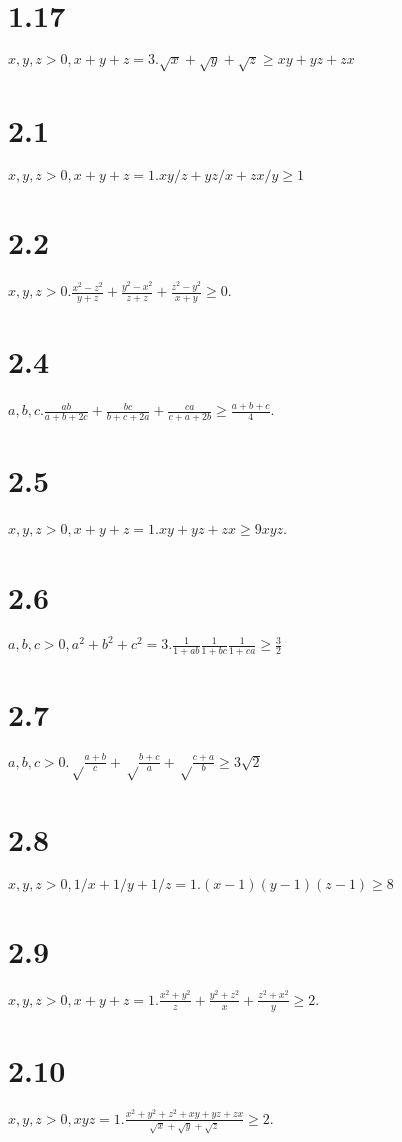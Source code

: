 \documentclass{article}
\begin{document}
\section*{1.17}

$x, y, z > 0, x + y + z = 3. \sqrt{x} + \sqrt{y} + \sqrt{z} \ge xy + yz + zx$

\section*{2.1}

$x, y, z > 0, x + y + z = 1. xy/z + yz/x + zx/y \ge 1$

\section*{2.2}

$x, y, z > 0. \frac{x^2 - z^2}{y + z} + \frac{y^2 - x^2}{z + z} + \frac{z^2 - y^2}{x + y} \ge 0$.

\section*{2.4}

$a, b, c. \frac{ab}{a + b + 2c} + \frac{bc}{b + c + 2a} + \frac{ca}{c + a + 2b} \ge \frac{a+b+c}{4}$.

\section*{2.5}

$x, y, z > 0, x + y + z = 1. xy + yz + zx \ge 9xyz$.

\section*{2.6}

$a, b, c > 0, a^2 + b^2 + c^2 = 3. \frac{1}{1 + ab} \frac{1}{1 + bc} \frac{1}{1 + ca} \ge \frac{3}{2}$

\section*{2.7}

$a, b, c > 0. \sqrt\frac{a+b}{c} + \sqrt\frac{b+c}{a} + \sqrt\frac{c+a}{b} \ge 3\sqrt 2$

\section*{2.8}

$x, y, z > 0, 1/x + 1/y + 1/z = 1. (x-1)(y-1)(z-1) \ge 8$

\section*{2.9}

$x, y, z > 0, x + y + z = 1. \frac{x^2 + y^2}{z} + \frac{y^2 + z^2}{x} + \frac{z^2 + x^2}{y} \ge 2$.

\section*{2.10}

$x, y, z > 0, xyz = 1. \frac{x^2 + y^2 + z^2 + xy + yz + zx}{\sqrt{x}+\sqrt{y}+\sqrt{z}} \ge 2$.
\end{document}

